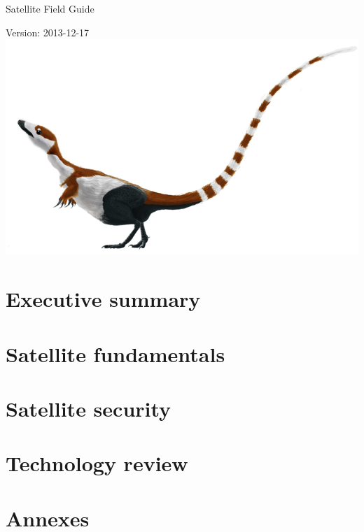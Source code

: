 \documentclass[oribibl]{scrbook}
\begin{document}
Satellite Field Guide

Version: 2013-12-17
\includegraphics{assets/images/cover.jpg}

\clearpage

\tableofcontents
\clearpage
\graphicspath{{./content/chapter_00_executive_summary/}}
\chapter{Executive summary}

\graphicspath{{./content/chapter_01_satellite_fundamentals/}}
\chapter{Satellite fundamentals}

\graphicspath{{./content/chapter_02_satellite_security/}}
\chapter{Satellite security}

\graphicspath{{./content/chapter_03_technology_review/}}
\chapter{Technology review}


\graphicspath{{./content/chapter_04_annexes/}}
\chapter{Annexes}

\end{document}
